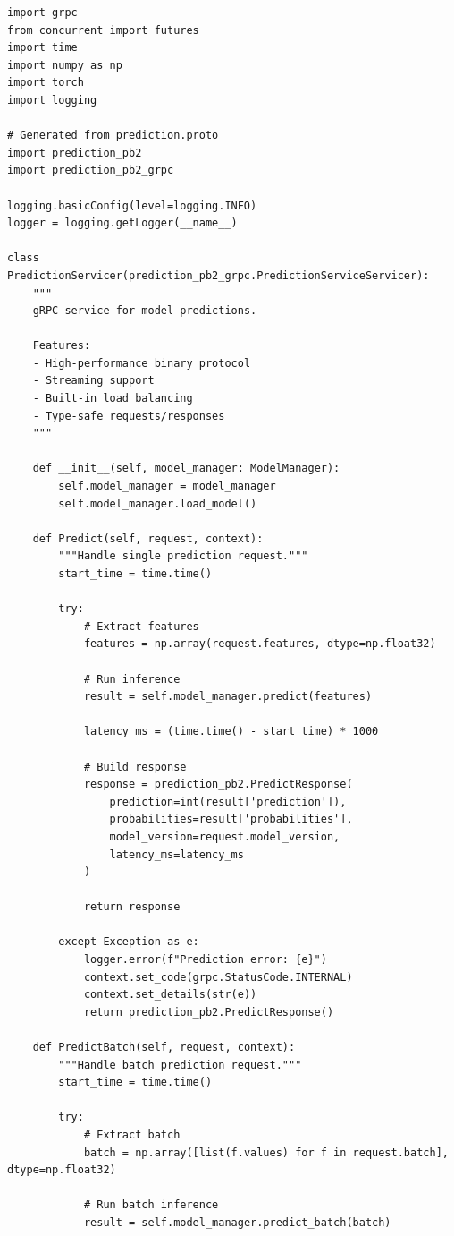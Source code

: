 \begin{lstlisting}[style=python, caption=gRPC server implementation]
import grpc
from concurrent import futures
import time
import numpy as np
import torch
import logging

# Generated from prediction.proto
import prediction_pb2
import prediction_pb2_grpc

logging.basicConfig(level=logging.INFO)
logger = logging.getLogger(__name__)

class PredictionServicer(prediction_pb2_grpc.PredictionServiceServicer):
    """
    gRPC service for model predictions.

    Features:
    - High-performance binary protocol
    - Streaming support
    - Built-in load balancing
    - Type-safe requests/responses
    """

    def __init__(self, model_manager: ModelManager):
        self.model_manager = model_manager
        self.model_manager.load_model()

    def Predict(self, request, context):
        """Handle single prediction request."""
        start_time = time.time()

        try:
            # Extract features
            features = np.array(request.features, dtype=np.float32)

            # Run inference
            result = self.model_manager.predict(features)

            latency_ms = (time.time() - start_time) * 1000

            # Build response
            response = prediction_pb2.PredictResponse(
                prediction=int(result['prediction']),
                probabilities=result['probabilities'],
                model_version=request.model_version,
                latency_ms=latency_ms
            )

            return response

        except Exception as e:
            logger.error(f"Prediction error: {e}")
            context.set_code(grpc.StatusCode.INTERNAL)
            context.set_details(str(e))
            return prediction_pb2.PredictResponse()

    def PredictBatch(self, request, context):
        """Handle batch prediction request."""
        start_time = time.time()

        try:
            # Extract batch
            batch = np.array([list(f.values) for f in request.batch], dtype=np.float32)

            # Run batch inference
            result = self.model_manager.predict_batch(batch)


\end{lstlisting}
